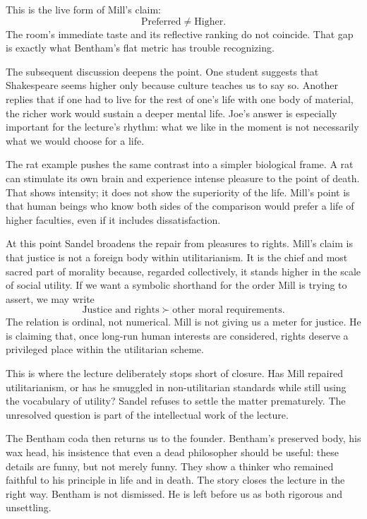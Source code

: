 This is the live form of Mill's claim:
\begin{equation}
\text{Preferred} \neq \text{Higher}.
\end{equation}
The room's immediate taste and its reflective ranking do not coincide. That gap is exactly what Bentham's flat metric has trouble recognizing.

The subsequent discussion deepens the point. One student suggests that Shakespeare seems higher only because culture teaches us to say so. Another replies that if one had to live for the rest of one's life with one body of material, the richer work would sustain a deeper mental life. Joe's answer is especially important for the lecture's rhythm: what we like in the moment is not necessarily what we would choose for a life.

The rat example pushes the same contrast into a simpler biological frame. A rat can stimulate its own brain and experience intense pleasure to the point of death. That shows intensity; it does not show the superiority of the life. Mill's point is that human beings who know both sides of the comparison would prefer a life of higher faculties, even if it includes dissatisfaction.

At this point Sandel broadens the repair from pleasures to rights. Mill's claim is that justice is not a foreign body within utilitarianism. It is the chief and most sacred part of morality because, regarded collectively, it stands higher in the scale of social utility. If we want a symbolic shorthand for the order Mill is trying to assert, we may write
\begin{equation}
\text{Justice and rights} \succ \text{other moral requirements}.
\end{equation}
The relation is ordinal, not numerical. Mill is not giving us a meter for justice. He is claiming that, once long-run human interests are considered, rights deserve a privileged place within the utilitarian scheme.

This is where the lecture deliberately stops short of closure. Has Mill repaired utilitarianism, or has he smuggled in non-utilitarian standards while still using the vocabulary of utility? Sandel refuses to settle the matter prematurely. The unresolved question is part of the intellectual work of the lecture.

The Bentham coda then returns us to the founder. Bentham's preserved body, his wax head, his insistence that even a dead philosopher should be useful: these details are funny, but not merely funny. They show a thinker who remained faithful to his principle in life and in death. The story closes the lecture in the right way. Bentham is not dismissed. He is left before us as both rigorous and unsettling.

